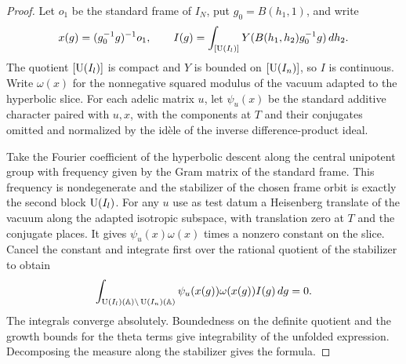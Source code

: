 \begin{proof}
Let $o_1$ be the standard frame of $I_N$, put $g_0=B(h_1,1)$, and write
\[
 x(g)=(g_0^{-1}g)^{-1}o_1,\qquad
 I(g)=\int_{[\operatorname{U}(I_l)]}Y(B(h_1,h_2)g_0^{-1}g)\,dh_2 .
\]
The quotient $[\operatorname{U}(I_l)]$ is compact and $Y$ is bounded on $[\operatorname{U}(I_n)]$, so $I$ is continuous. Write $\omega(x)$ for the nonnegative squared modulus of the vacuum adapted to the hyperbolic slice. For each adelic matrix $u$, let $\psi_u(x)$ be the standard additive character paired with $u,x$, with the components at $T$ and their conjugates omitted and normalized by the idèle of the inverse difference-product ideal.

Take the Fourier coefficient of the hyperbolic descent along the central unipotent group with frequency given by the Gram matrix of the standard frame. This frequency is nondegenerate and the stabilizer of the chosen frame orbit is exactly the second block $\operatorname{U}(I_l)$. For any $u$ use as test datum a Heisenberg translate of the vacuum along the adapted isotropic subspace, with translation zero at $T$ and the conjugate places. It gives $\psi_u(x)\omega(x)$ times a nonzero constant on the slice. Cancel the constant and integrate first over the rational quotient of the stabilizer to obtain
\[
 \int_{\operatorname{U}(I_l)(\mathbb A)\backslash \operatorname{U}(I_n)(\mathbb A)}
           \psi_u(x(g))\omega(x(g))I(g)\,dg=0 .
\]
The integrals converge absolutely. Boundedness on the definite quotient and the growth bounds for the theta terms give integrability of the unfolded expression. Decomposing the measure along the stabilizer gives the formula.


\end{proof}
